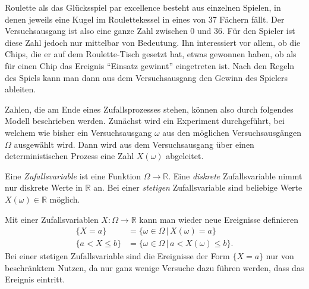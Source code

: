 Roulette als das Glücksspiel par excellence besteht aus einzelnen
Spielen, in denen jeweils eine Kugel im Roulettekessel in eines von
37 Fächern fällt.
Der Versuchsausgang ist also eine ganze Zahl zwischen $0$ und $36$.
Für den Spieler ist diese Zahl jedoch nur mittelbar von Bedeutung.
Ihn interessiert vor allem, ob die Chips, die er auf dem Roulette-Tisch
gesetzt hat, etwas gewonnen haben, ob als für einen Chip das Ereignis
``Einsatz gewinnt'' eingetreten ist.
Nach den Regeln des Spiels kann man dann aus dem Versuchsausgang den
Gewinn des Spielers ableiten.

Zahlen, die am Ende eines Zufallsprozesses stehen, können also durch
folgendes Modell beschrieben werden.
Zunächst wird ein Experiment durchgeführt, bei welchem wie bisher
ein Versuchsausgang $\omega$ aus den möglichen Versuchsausgängen $\Omega$
ausgewählt wird.
Dann wird aus dem Versuchsausgang über einen deterministischen Prozess
eine Zahl $X(\omega)$ abgeleitet.

\begin{definition}
Eine {\em Zufallsvariable} ist eine Funktion $\Omega\to\mathbb R$.
Eine {\em diskrete} Zufallsvariable nimmt nur diskrete Werte in $\mathbb R$ an.
Bei einer {\em stetigen} Zufallsvariable sind beliebige Werte $X(\omega)\in\mathbb R$
möglich.
\end{definition}

Mit einer Zufallsvariablen $X\colon\Omega\to\mathbb R$ kann man wieder
neue Ereignisse definieren
\begin{align*}
\{X=a\}&=\{\omega\in\Omega\,|\,X(\omega)=a\}
\\
\{a<X\le b\}
&=
\{\omega\in\Omega\,|\, a<X(\omega)\le b\}.
\end{align*}
Bei einer stetigen Zufallsvariable sind die Ereignisse der Form
$\{X=a\}$ nur von beschränktem Nutzen, da nur ganz wenige Versuche
dazu führen werden, dass das Ereignis eintritt.

